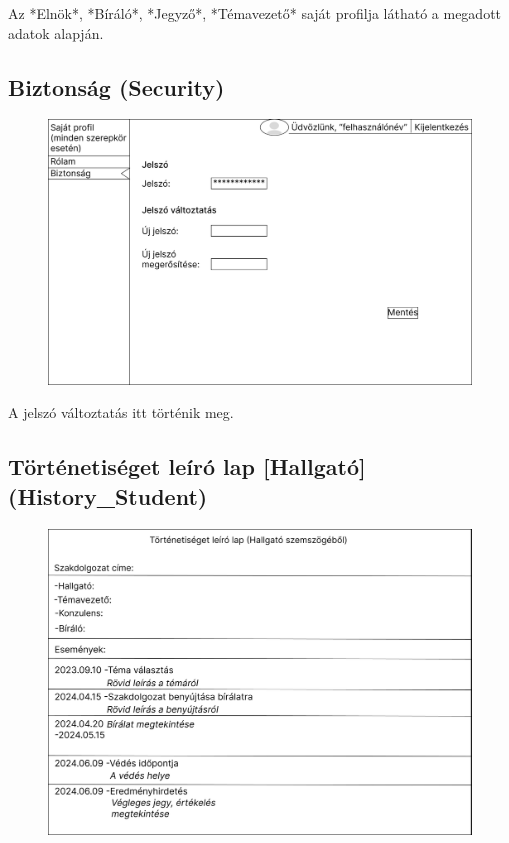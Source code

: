 \documentclass[a4paper,12pt]{article}
\begin{document}
Az *Elnök*, *Bíráló*, *Jegyző*, *Témavezető* saját profilja látható a megadott adatok alapján.    

\subsection{Biztonság (Security)}

\begin{figure}
	\centering
	\includegraphics[width=\textwidth]{images/Web_pages/Security.jpg}
	\caption{}
	\label{fig:Security}
\end{figure}

A jelszó változtatás itt történik meg.

\subsection{Történetiséget leíró lap [Hallgató] (History\_Student)}

\begin{figure}
	\centering
	\includegraphics[width=\textwidth]{images/Web_pages/History_Student.jpg}
	\caption{}
	\label{fig:History_Student}
\end{figure}
\end{document}
